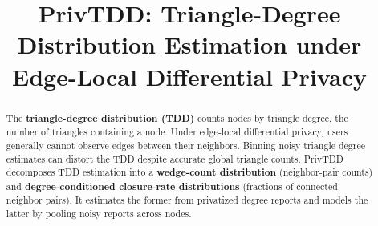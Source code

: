 \documentclass[conference]{IEEEtran}
\begin{document}
\title{PrivTDD: Triangle-Degree Distribution Estimation under Edge-Local Differential Privacy}

\maketitle
\begin{abstract}

The \textbf{triangle-degree distribution (TDD)} counts nodes by triangle degree, the number of triangles containing a node. Under edge-local differential privacy, users generally cannot observe edges between their neighbors. Binning noisy triangle-degree estimates can distort the TDD despite accurate global triangle counts.
PrivTDD decomposes TDD estimation into a \textbf{wedge-count distribution} (neighbor-pair counts) and \textbf{degree-conditioned closure-rate distributions} (fractions of connected neighbor pairs). It estimates the former from privatized degree reports and models the latter by pooling noisy reports across nodes.

\end{abstract}
\end{document}
